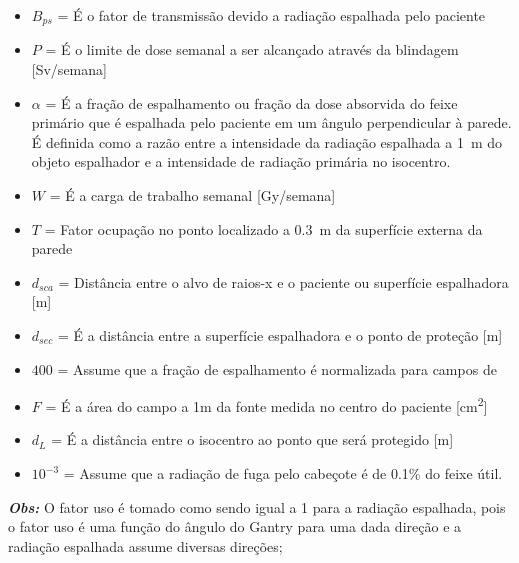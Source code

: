 \documentclass[11pt,a4paper]{article}
\begin{document}
            \begin{itemize}
                \item $B_{ps}$ = É o fator de transmissão devido a radiação espalhada pelo paciente
                
                \item $P$ = É o limite de dose semanal a ser alcançado através da blindagem [\unit{Sv/semana}]
                
                \item $\alpha$ = É a fração de espalhamento ou fração da dose absorvida do feixe primário que é espalhada pelo paciente em um ângulo perpendicular à parede. É definida como a razão entre a intensidade da radiação espalhada a \qty{1}{m} do objeto espalhador e a intensidade de radiação primária no isocentro.
                
                \item $W$ = É a carga de trabalho semanal [\unit{Gy/semana}] 
                
                \item $T$ = Fator ocupação no ponto localizado a \qty{0.3}{m} da superfície externa da parede
                
                \item $d_{sca}$ = Distância entre o alvo de raios-x e o paciente ou superfície espalhadora [\unit{m}]
                
                \item $d_{sec}$ = É a distância entre a superfície espalhadora e o ponto de proteção [\unit{m}]
                
                \item $400$ = Assume que a fração de espalhamento é normalizada para campos de 
                
                \item $F$ = É a área do campo a 1m da fonte medida no centro do paciente [\unit{cm^2}]
                
                \item $d_L$ = É a distância entre o isocentro ao ponto que será protegido [\unit{m}]
                
                \item $10^{-3}$ = Assume que a radiação de fuga pelo cabeçote é de 0.1\% do feixe útil.
            \end{itemize}

            
            \textbf{\textit{\textcolor{CarnationPink}{Obs:}}} O fator uso é tomado como sendo igual a 1 para a radiação espalhada, pois o fator uso é uma função do ângulo do Gantry para uma dada direção e a radiação espalhada assume diversas direções;
\end{document}

